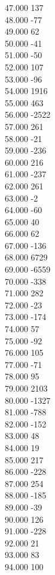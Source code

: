 { 47.000	137 \\
 48.000	-77 \\
 49.000	62 \\
 50.000	-41 \\
 51.000	-50 \\
 52.000	107 \\
 53.000	-96 \\
 54.000	1916 \\
 55.000	463 \\
 56.000	-2522 \\
 57.000	261 \\
 58.000	-21 \\
 59.000	-236 \\
 60.000	216 \\
 61.000	-237 \\
 62.000	261 \\
 63.000	-2 \\
 64.000	-60 \\
 65.000	40 \\
 66.000	62 \\
 67.000	-136 \\
 68.000	6729 \\
 69.000	-6559 \\
 70.000	-338 \\
 71.000	282 \\
 72.000	-23 \\
 73.000	-174 \\
 74.000	57 \\
 75.000	-92 \\
 76.000	105 \\
 77.000	-71 \\
 78.000	95 \\
 79.000	2103 \\
 80.000	-1327 \\
 81.000	-788 \\
 82.000	-152 \\
 83.000	48 \\
 84.000	19 \\
 85.000	217 \\
 86.000	-228 \\
 87.000	254 \\
 88.000	-185 \\
 89.000	-39 \\
 90.000	126 \\
 91.000	-228 \\
 92.000	21 \\
 93.000	83 \\
 94.000	100 \\
}
